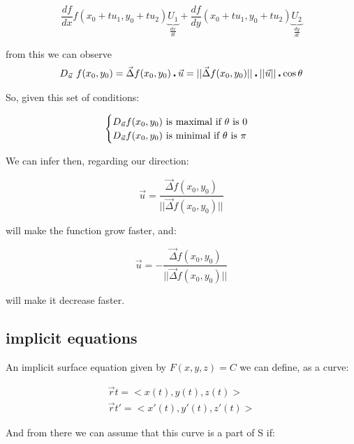 \documentclass[11pt,fleqn]{book} %
\begin{document}
\begin{equation}
    \frac{df}{dx} f(x_0 + t u_1, y_0 + t u_2) \underbrace{U_1}_{\frac{dx}{dt}} + \frac{df}{dy}(x_0 + t u_1, y_0 + t u_2) \underbrace{U_2}_{\frac{dy}{dt}}
\end{equation}

from this we can observe
\begin{equation}
    D_{\vec{u}}\ f(x_0, y_0) = \vec{\Delta} f(x_0, y_0) \centerdot \vec{u} = ||\vec{\Delta} f(x_0,y_0)|| \centerdot ||\vec{u}|| \centerdot \cos \theta\\
\end{equation}

So, given this set of conditions:

\begin{gather}
    \begin{cases}
        D_{\vec{u}} f(x_0, y_0) \text{  is maximal if $ \theta $ is 0} \\
        D_{\vec{u}} f(x_0, y_0) \text{  is minimal if $ \theta $ is $\pi$}
    \end{cases}
\end{gather}

We can infer then, regarding our direction:

\begin{equation}
    \vec{u} = \frac{\vec{\Delta} f(x_0, y_0)}{||\vec{\Delta}f(x_0,y_0)||}
\end{equation}

will make the function grow faster, and:

\begin{equation}
    \vec{u} = - \frac{\vec{\Delta} f(x_0, y_0)}{||\vec{\Delta}f(x_0,y_0)||}
\end{equation}

will make it decrease faster.
 

\subsection{implicit equations}

An implicit surface equation given by $F(x,y,z) = C$ we can define, as a curve:

\begin{gather}
    \vec{r}t = <x(t),y(t),z(t)> \\
    \vec{r}t' = <x'(t),y'(t),z'(t)> 
\end{gather}

And from there we can assume that this curve is a part of S if:
\end{document}
